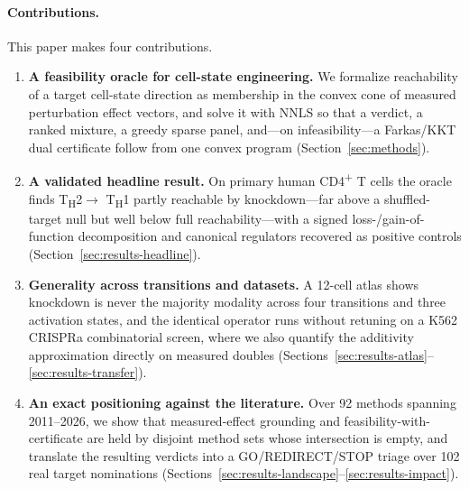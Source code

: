 \paragraph{Contributions.}
This paper makes four contributions.
\begin{enumerate}
\item \textbf{A feasibility oracle for cell-state engineering.} We formalize reachability of
a target cell-state direction as membership in the convex cone of measured perturbation effect
vectors, and solve it with NNLS so that a verdict, a ranked mixture, a greedy sparse panel,
and---on infeasibility---a Farkas/KKT dual certificate follow from one convex program
(Section~\ref{sec:methods}).
\item \textbf{A validated headline result.} On primary human
CD4\textsuperscript{+} T cells the oracle finds T\textsubscript{H}2$\rightarrow$%
T\textsubscript{H}1 partly reachable by knockdown---far above a shuffled-target null but well
below full reachability---with a signed loss-/gain-of-function decomposition and canonical
regulators recovered as positive controls (Section~\ref{sec:results-headline}).
\item \textbf{Generality across transitions and datasets.} A 12-cell atlas shows knockdown
is never the majority modality across four transitions and three activation states, and the
identical operator runs without retuning on a K562 CRISPRa combinatorial screen, where
we also quantify the additivity approximation directly on measured doubles
(Sections~\ref{sec:results-atlas}--\ref{sec:results-transfer}).
\item \textbf{An exact positioning against the literature.} Over 92 methods spanning
2011--2026, we show that measured-effect grounding and feasibility-with-certificate are held
by disjoint method sets whose intersection is empty, and translate the resulting verdicts
into a GO/REDIRECT/STOP triage over 102 real target nominations
(Sections~\ref{sec:results-landscape}--\ref{sec:results-impact}).
\end{enumerate}
